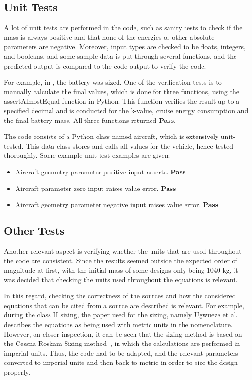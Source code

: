\subsection{Unit Tests}

A lot of unit tests are performed in the code, such as sanity tests to check if the mass is always positive and that none of the energies or other absolute parameters are negative.
Moreover, input types are checked to be floats, integers, and booleans, and some sample data is put through several functions, and the predicted output is compared to the code output to verify the code.

For example, in , the battery was sized.
One of the verification tests is to manually calculate the final values, which is done for three functions, using the assertAlmostEqual function in Python. This function verifies the result up to a specified decimal and is conducted for the k-value, cruise energy consumption and the final battery mass.
All three functions returned \textbf{Pass}.

The code consists of a Python class named aircraft, which is extensively unit-tested.
This data class stores and calls all values for the vehicle, hence tested thoroughly.
Some example unit test examples are given:
\begin{itemize}
    \item Aircraft geometry parameter positive input asserts. \textbf{Pass}
    \item Aircraft parameter zero input raises value error. \textbf{Pass}
    \item Aircraft geometry parameter negative input raises value error. \textbf{Pass}
\end{itemize}

\subsection{Other Tests}
Another relevant aspect is verifying whether the units that are used throughout the code are consistent.
Since the results seemed outside the expected order of magnitude at first, with the initial mass of some designs only being 1040 kg, it was decided that checking the units used throughout the equations is relevant.

In this regard, checking the correctness of the sources and how the considered equations that can be cited from a source are described is relevant.
For example, during the class II sizing, the paper used for the sizing, namely Ugwueze et al.~\cite{Ugwueze_Sizing_Method} describes the equations as being used with metric units in the nomenclature.
However, on closer inspection, it can be seen that the sizing method is based on the Cessna Roskam Sizing method~\cite{Roskam_Part_V}, in which the calculations are performed in imperial units.
Thus, the code had to be adapted, and the relevant parameters converted to imperial units and then back to metric in order to size the design properly.


